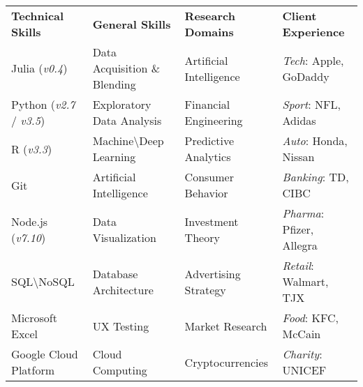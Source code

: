 \documentclass[a4paper]{letter}
\begin{document}
\vspace{-3mm}


\vspace{5mm}
\begin{small}
\begin{tabu} to \textwidth {XXXX}
\textbf{Technical Skills} & \textbf{General Skills} & \textbf{Research Domains} & \textbf{Client Experience} \\
\rule{0pt}{2ex}\hspace{-1mm} Julia (\textit{v0.4}) & Data Acquisition \& Blending   & Artificial Intelligence  & \textit{Tech}: Apple, GoDaddy \\
Python (\textit{v2.7} / \textit{v3.5}) &  Exploratory Data Analysis  & Financial Engineering & \textit{Sport}: NFL, Adidas \\
R (\textit{v3.3}) & Machine\textbackslash  Deep Learning  & Predictive Analytics & \textit{Auto}: Honda, Nissan  \\
Git & Artificial Intelligence   & Consumer Behavior  & \textit{Banking}: TD, CIBC   \\
Node.js (\textit{v7.10}) & Data Visualization & Investment Theory & \textit{Pharma}: Pfizer, Allegra \\
SQL\textbackslash NoSQL & Database Architecture  & Advertising Strategy  & \textit{Retail}: Walmart, TJX \\
Microsoft Excel & UX Testing & Market Research & \textit{Food}: KFC, McCain \\
Google Cloud Platform & Cloud Computing & Cryptocurrencies  & \textit{Charity}: UNICEF \\
\end{tabu}
\end{small}


\vspace{-3mm}
\end{document}
